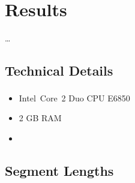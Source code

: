 \chapter{Results}
\ldots{}

\section{Technical Details}
\begin{itemize}
  \item Intel\textsuperscript{\textregistered}~Core\texttrademark~2 Duo CPU E6850
  \item 2 GB RAM
  \item {}
\end{itemize}

\section{Segment Lengths}

